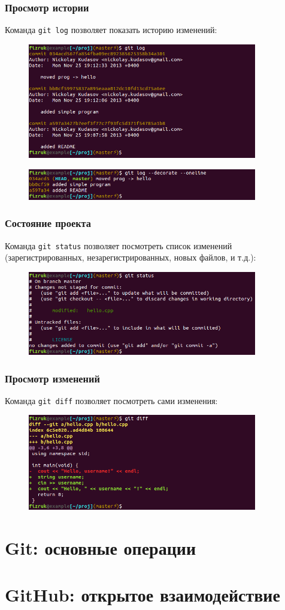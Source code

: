 \documentclass{beamer}
\begin{document}
\begin{frame}
  \frametitle{Просмотр истории}
  Команда \texttt{git log} позволяет показать историю изменений:

  \begin{figure}
     \includegraphics[width=10cm]{images/git-log.png}
  \end{figure}

  \begin{figure}
     \includegraphics[width=10cm]{images/git-log-oneline-decorate.png}
  \end{figure}
\end{frame}

\begin{frame}
  \frametitle{Состояние проекта}
  Команда \texttt{git status} позволяет посмотреть список изменений
  (зарегистрированных, незарегистрированных, новых файлов, и т.д.):

  \begin{figure}
    \includegraphics[width=10cm]{images/git-status.png}
  \end{figure}
\end{frame}

\begin{frame}
  \frametitle{Просмотр изменений}
  Команда \texttt{git diff} позволяет посмотреть сами изменения:

  \begin{figure}
    \includegraphics[width=10cm]{images/git-diff.png}
  \end{figure}
\end{frame}

\section{Git: основные операции}

\section{GitHub: открытое взаимодействие}
\end{document}
